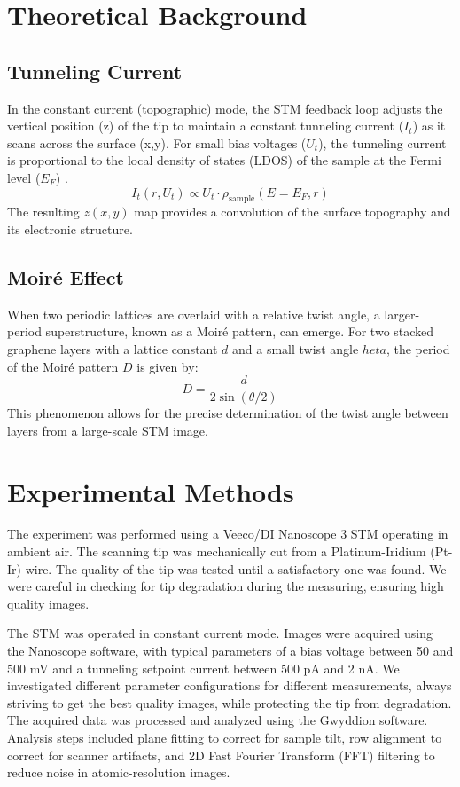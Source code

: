 \documentclass[12pt,a4paper]{article}
\begin{document}
\section{Theoretical Background}
\subsection{Tunneling Current}
In the constant current (topographic) mode, the STM feedback loop adjusts the vertical position (z) of the tip to maintain a constant tunneling current ($I_t$) as it scans across the surface (x,y). For small bias voltages ($U_t$), the tunneling current is proportional to the local density of states (LDOS) of the sample at the Fermi level ($E_F$) \cite{stm_manual}.
\begin{equation}
    I_t(r, U_t) \propto U_t \cdot \rho_{\text{sample}}(E = E_F, r)
\end{equation}
The resulting $z(x,y)$ map provides a convolution of the surface topography and its electronic structure.

\subsection{Moiré Effect}
When two periodic lattices are overlaid with a relative twist angle, a larger-period superstructure, known as a Moiré pattern, can emerge. For two stacked graphene layers with a lattice constant $d$ and a small twist angle $	heta$, the period of the Moiré pattern $D$ is given by:
\begin{equation}
    D = \frac{d}{2 \sin(\theta/2)}
    \label{eq:moire}
\end{equation}
This phenomenon allows for the precise determination of the twist angle between layers from a large-scale STM image.

\section{Experimental Methods}
The experiment was performed using a Veeco/DI Nanoscope 3 STM operating in ambient air. The scanning tip was mechanically cut from a Platinum-Iridium (Pt-Ir) wire. The quality of the tip was tested until a satisfactory one was found. We were careful in checking for tip degradation during the measuring, ensuring high quality images.

The STM was operated in constant current mode. Images were acquired using the Nanoscope software, with typical parameters of a bias voltage between 50 and 500 mV and a tunneling setpoint current between 500 pA and 2 nA. We investigated different parameter configurations for different measurements, always striving to get the best quality images, while protecting the tip from degradation. The acquired data was processed and analyzed using the Gwyddion software. Analysis steps included plane fitting to correct for sample tilt, row alignment to correct for scanner artifacts, and 2D Fast Fourier Transform (FFT) filtering to reduce noise in atomic-resolution images.
\end{document}
